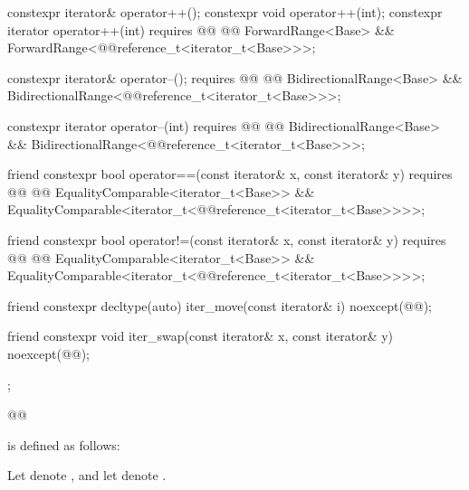 {\begin{codeblock}
{{    constexpr iterator& operator++();
    constexpr void operator++(int);
    constexpr iterator operator++(int)
      requires @@
        @@ ForwardRange<Base> &&
        ForwardRange<@@reference_t<iterator_t<Base>>>;

    constexpr iterator& operator--();
      requires @@
        @@ BidirectionalRange<Base> &&
        BidirectionalRange<@@reference_t<iterator_t<Base>>>;

    constexpr iterator operator--(int)
      requires @@
        @@ BidirectionalRange<Base> &&
        BidirectionalRange<@@reference_t<iterator_t<Base>>>;

    friend constexpr bool operator==(const iterator& x, const iterator& y)
      requires @@
        @@ EqualityComparable<iterator_t<Base>> &&
        EqualityComparable<iterator_t<@@reference_t<iterator_t<Base>>>>;

    friend constexpr bool operator!=(const iterator& x, const iterator& y)
      requires @@
        @@ EqualityComparable<iterator_t<Base>> &&
        EqualityComparable<iterator_t<@@reference_t<iterator_t<Base>>>>;

    friend constexpr decltype(auto) iter_move(const iterator& i)
      noexcept(@\oldtxt{\seebelow}@);

    friend constexpr void iter_swap(const iterator& x, const iterator& y)
      noexcept(@\oldtxt{\seebelow}@);
  };
}@\oldtxt{\}}@
\end{codeblock}

\pnum
{} is defined as follows:
\begin{itemize}
{\color{newclr}
\item
Let  denote
, and
let  denote
.

}
\end{itemize}}

